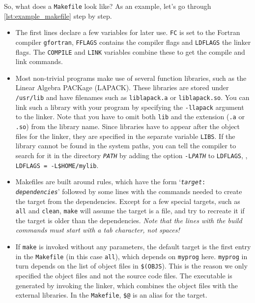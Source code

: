 \documentclass[openany,oneside]{report}
\begin{document}

So, what does a \texttt{Makefile} look like? As an example, let's go through \autoref{lst:example_makefile} step by step.
\begin{itemize}
  \item The first lines declare a few variables for later use.
    \texttt{FC} is set to the Fortran compiler \texttt{gfortran}, \texttt{FFLAGS} contains the compiler flags and \texttt{LDFLAGS} the linker flags.
    The \texttt{COMPILE} and \texttt{LINK} variables combine these to get the compile and link commands.
  \item Most non-trivial programs make use of several function libraries, such as the Linear Algebra PACKage (LAPACK).
    These libraries are stored under \texttt{/usr/lib} and have filenames such as \texttt{liblapack.a} or \texttt{liblapack.so}.
    You can link such a library with your program by specifying the \texttt{-llapack} argument to the linker.
    Note that you have to omit both \texttt{lib} and the extension (\texttt{.a} or \texttt{.so}) from the library name.
    Since libraries have to appear after the object files for the linker, they are specified in the separate variable \texttt{LIBS}.
    If the library cannot be found in the system paths, you can tell the compiler to search for it in the directory \texttt{\emph{PATH}} by adding the option \texttt{-L\emph{PATH}} to \texttt{LDFLAGS}, \eg, \texttt{LDFLAGS = -L\$HOME/mylib}.
  \item Makefiles are built around rules, which have the form `\texttt{\emph{target}: \emph{dependencies}}' followed by some lines with the commands needed to create the target from the dependencies.
    Except for a few special targets, such as \texttt{all} and \texttt{clean}, \texttt{make} will assume the target is a file, and try to recreate it if the target is older than the dependencies.
    \emph{Note that the lines with the build commands must start with a tab character, not spaces!}
  \item If \texttt{make} is invoked without any parameters, the default target is the first entry in the \texttt{Makefile} (in this case \texttt{all}), which depends on \texttt{myprog} here.
    \texttt{myprog} in turn depends on the list of object files in \texttt{\$(OBJS}).
    This is the reason we only specified the object files and not the source code files.
    The executable is generated by invoking the linker, which combines the object files with the external libraries.
    In the \texttt{Makefile}, \texttt{\$@} is an alias for the target.

\end{itemize}
\end{document}
